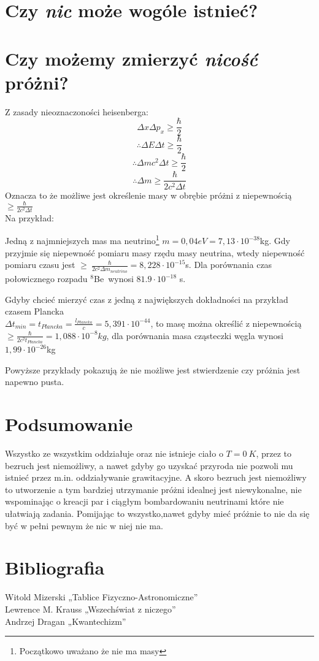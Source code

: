 \documentclass{article}
\begin{document}
\section{Czy \textit{nic} może wogóle istnieć?}

\section{Czy możemy zmierzyć \textit{nicość} próżni?}
Z zasady nieoznaczoności heisenberga:
$$ \Delta x \Delta p_x \geq \frac{\hbar}{2} $$
$$\therefore \Delta E \Delta t \geq \frac{\hbar}{2}$$
$$\therefore \Delta mc^2 \Delta t \geq \frac{\hbar}{2}$$
$$\therefore \Delta m \geq \frac{\hbar}{2c^2\Delta t}$$
Oznacza to że możliwe jest określenie masy w obrębie próżni z niepewnością $\geq \frac{\hbar}{2c^2\Delta t}$\\
Na przykład:

Jedną z najmniejszych mas ma neutrino\footnote{Początkowo uważano że nie ma masy}
$m=0,04 eV=7,13\cdot10^{-38}$kg.
Gdy przyjmie się niepewność pomiaru masy rzędu masy neutrina,
wtedy niepewność pomiaru czasu jest
$\geq~\frac{\hbar}{2c^2\Delta m_{neutrino}}=8,228\cdot10^{-15}$s.
Dla porównania czas połowicznego rozpadu $^{8}$Be~wynosi $81.9\cdot 10^{-18}$ s.

Gdyby chcieć mierzyć czas z jedną z największych dokładności na przykład czasem Plancka\\
$\Delta t_{min}=t_{Plancka}=\frac{l_{Plancka}}{c}=5,391\cdot10^{-44}$, to masę można określić z niepewnością
$ \geq \frac{\hbar}{2c^2t_{Plancka}} = 1,088\cdot 10^{-8}kg$,
dla porównania masa cząsteczki węgla wynosi $1,99\cdot10^{-26}$kg

Powyższe przykłady pokazują że nie możliwe jest stwierdzenie czy próżnia jest napewno pusta.

\section{Podsumowanie}
Wszystko ze wszystkim oddziałuje oraz nie istnieje ciało o $T=0~K$, przez to bezruch jest niemożliwy,
a nawet gdyby go uzyskać przyroda nie pozwoli mu istnieć przez m.in. oddziaływanie grawitacyjne.
A skoro bezruch jest niemożliwy to utworzenie a tym bardziej utrzymanie próżni idealnej jest niewykonalne,
nie wspominając o kreacji par i ciągłym bombardowaniu neutrinami które nie ułatwiają zadania.
Pomijając to wszystko,nawet gdyby mieć próżnie to nie da się być w pełni pewnym że nic w niej nie ma.

\section{Bibliografia}
Witold Mizerski „Tablice Fizyczno-Astronomiczne”\\
Lewrence M. Krauss „Wszechświat z niczego”\\
Andrzej Dragan „Kwantechizm”

\tableofcontents
\listoftodos
\end{document}
